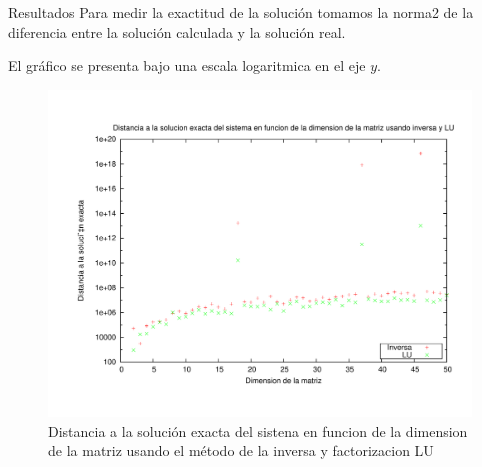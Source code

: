 \begin{section}{Resultados}
	Para medir la exactitud de la solución tomamos la norma2 de la diferencia entre la solución calculada y la solución real.
	
	El gráfico se presenta bajo una escala logaritmica en el eje $y$.
	
	\begin{figure}[H]
	  \centering
		\includegraphics[width=14cm]{graficos/inv_vs_lu.pdf}
	  \caption{Distancia a la solución exacta del sistena en funcion de la dimension de la matriz usando el método de la inversa y factorizacion LU}
	  \label{fig:inv_vs_lu}
	\end{figure}
\end{section}
